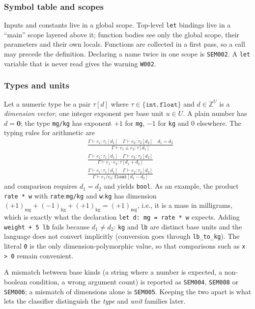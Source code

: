 \documentclass[conference]{IEEEtran}
\newcommand{\code}[1]{\texttt{#1}}
\begin{document}
\subsubsection{Symbol table and scopes}

Inputs and constants live in a global scope. Top-level \code{let} bindings live in a ``main'' scope layered above
it; function bodies see only the global scope, their parameters and their own locals. Functions are collected in a
first pass, so a call may precede the definition. Declaring a name twice in one scope is \code{SEM002}. A
\code{let} variable that is never read gives the warning \code{W002}.

\subsubsection{Types and units}

Let a numeric type be a pair $\tau[d]$ where $\tau\in\{\texttt{int},\texttt{float}\}$ and $d\in\mathbb{Z}^{U}$ is a
\emph{dimension vector}, one integer exponent per base unit $u\in U$. A plain number has $d=\mathbf{0}$; the type
\code{mg/kg} has exponent $+1$ for \code{mg}, $-1$ for \code{kg} and $0$ elsewhere. The typing rules for arithmetic are
\begin{align}
&\frac{\Gamma\vdash e_1:\tau_1[d_1]\quad\Gamma\vdash e_2:\tau_2[d_2]\quad d_1=d_2}
     {\Gamma\vdash e_1\pm e_2:\tau[d_1]}\\[4pt]
&\frac{\Gamma\vdash e_1:\tau_1[d_1]\quad\Gamma\vdash e_2:\tau_2[d_2]}
     {\Gamma\vdash e_1\cdot e_2:\tau[d_1+d_2]}\\[4pt]
&\frac{\Gamma\vdash e_1:\tau_1[d_1]\quad\Gamma\vdash e_2:\tau_2[d_2]}
     {\Gamma\vdash e_1/e_2:\texttt{float}[d_1-d_2]}
\end{align}
and comparison requires $d_1=d_2$ and yields \code{bool}. As an example, the product \code{rate * w} with
\code{rate}:\code{mg/kg} and \code{w}:\code{kg} has dimension $(+1)_{\text{mg}}+(-1)_{\text{kg}}+(+1)_{\text{kg}}=(+1)_{\text{mg}}$,
i.e., it is a mass in milligrams, which is exactly what the declaration \code{let d: mg = rate * w} expects.
Adding \code{weight + 5 lb} fails because $d_1\ne d_2$: \code{kg} and \code{lb} are distinct base units and the
language does not convert implicitly (conversion goes through \code{lb\_to\_kg}). The literal \code{0} is the only
dimension-polymorphic value, so that comparisons such as \code{x > 0} remain convenient.

A mismatch between base kinds (a string where a number is expected, a non-boolean condition, a wrong argument count)
is reported as \code{SEM004}, \code{SEM008} or \code{SEM006}; a mismatch of dimensions alone is \code{SEM005}. Keeping
the two apart is what lets the classifier distinguish the \emph{type} and \emph{unit} families later.
\end{document}

